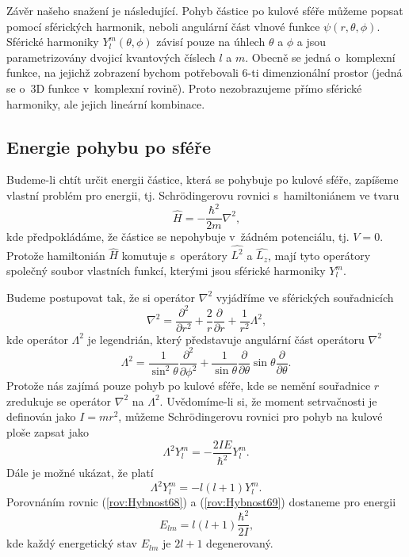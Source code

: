 Závěr našeho snažení je následující. Pohyb částice po kulové sféře můžeme popsat pomocí sférických harmonik, neboli angulární část vlnové funkce $\psi(r,\theta,\phi)$. Sférické harmoniky $Y_l^{m}(\theta, \phi)$ závisí pouze na úhlech $\theta$ a $\phi$ a jsou parametrizovány dvojicí kvantových číslech $l$ a $m$. Obecně se jedná o~komplexní funkce, na jejichž zobrazení bychom potřebovali 6-ti dimenzionální prostor (jedná se o~3D funkce v~komplexní rovině). Proto nezobrazujeme přímo sférické harmoniky, ale jejich lineární kombinace.

\subsection{Energie pohybu po sféře}
\label{kap:EnergiePohybSfera}

Budeme-li chtít určit energii částice, která se pohybuje po kulové sféře, zapíšeme vlastní problém pro energii, tj. Schrödingerovu rovnici s~hamiltoniánem ve tvaru
\begin{equation}
\hat{H} = -\frac{\hbar^2}{2m}\nabla^2 \mbox{,}
\label{rov:Hybnost65}
\end{equation}
kde předpokládáme, že částice se nepohybuje v~žádném potenciálu, tj. $V=0$. Protože hamiltonián $\hat{H}$ komutuje s~operátory $\hat{L^2}$ a $\hat{L_z}$, mají tyto operátory společný soubor vlastních funkcí, kterými jsou sférické harmoniky $Y_l^m$.

Budeme postupovat tak, že si operátor $\nabla^2$ vyjádříme ve sférických souřadnicích
\begin{equation}
\nabla^2 = \frac{\partial^2}{\partial r^2} + \frac{2}{r}\frac{\partial}{\partial r} + \frac{1}{r^2}\Lambda^2 \mbox{,}
\label{rov:Hybnost66}
\end{equation}
kde operátor $\Lambda^2$ je legendrián, který představuje angulární část operátoru $\nabla^2$
\begin{equation}
\Lambda^2 = \frac{1}{\sin^2 \theta}\frac{\partial^2}{\partial \phi^2} + \frac{1}{\sin \theta}\frac{\partial}{\partial \theta}\sin \theta \frac{\partial}{\partial \theta}\mbox{.}
\label{rov:Hybnost67}
\end{equation}
Protože nás zajímá pouze pohyb po kulové sféře, kde se nemění souřadnice $r$ zredukuje se operátor $\nabla^2$ na $\Lambda^2$. Uvědomíme-li si, že moment setrvačnosti je definován jako $I=mr^2$, můžeme Schrödingerovu rovnici pro pohyb na kulové ploše zapsat jako
\begin{equation}
\Lambda^2 Y_l^m = - \frac{2 I E}{\hbar^2} Y_l^m \mbox{.}
\label{rov:Hybnost68}
\end{equation}
Dále je možné ukázat, že platí 
\begin{equation}
\Lambda^2 Y_l^m = -l(l+1) Y_l^m \mbox{.}
\label{rov:Hybnost69}
\end{equation}
Porovnáním rovnic (\ref{rov:Hybnost68}) a (\ref{rov:Hybnost69}) dostaneme pro energii
\begin{equation}
\boxed{E_{lm} = l(l+1)\frac{\hbar^2}{2I} \mbox{,}}
\label{rov:Hybnost70}
\end{equation}
kde každý energetický stav $E_{lm}$ je $2l+1$ degenerovaný.

